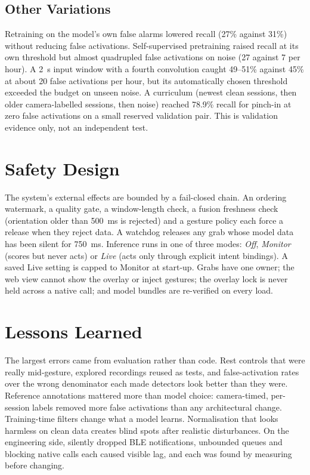 \subsection{Other Variations}

Retraining on the model's own false alarms lowered recall (27\% against 31\%) without reducing false activations. Self-supervised pretraining raised recall at its own threshold but almost quadrupled false activations on noise (27 against 7 per hour). A 2~s input window with a fourth convolution caught 49--51\% against 45\% at about 20 false activations per hour, but its automatically chosen threshold exceeded the budget on unseen noise. A curriculum (newest clean sessions, then older camera-labelled sessions, then noise) reached 78.9\% recall for pinch-in at zero false activations on a small reserved validation pair. This is validation evidence only, not an independent test.

\section{Safety Design}

The system's external effects are bounded by a fail-closed chain. An ordering watermark, a quality gate, a window-length check, a fusion freshness check (orientation older than 500~ms is rejected) and a gesture policy each force a release when they reject data. A watchdog releases any grab whose model data has been silent for 750~ms. Inference runs in one of three modes: \emph{Off}, \emph{Monitor} (scores but never acts) or \emph{Live} (acts only through explicit intent bindings). A saved Live setting is capped to Monitor at start-up. Grabs have one owner; the web view cannot show the overlay or inject gestures; the overlay lock is never held across a native call; and model bundles are re-verified on every load.

\section{Lessons Learned}

The largest errors came from evaluation rather than code. Rest controls that were really mid-gesture, explored recordings reused as tests, and false-activation rates over the wrong denominator each made detectors look better than they were. Reference annotations mattered more than model choice: camera-timed, per-session labels removed more false activations than any architectural change. Training-time filters change what a model learns. Normalisation that looks harmless on clean data creates blind spots after realistic disturbances. On the engineering side, silently dropped BLE notifications, unbounded queues and blocking native calls each caused visible lag, and each was found by measuring before changing.


